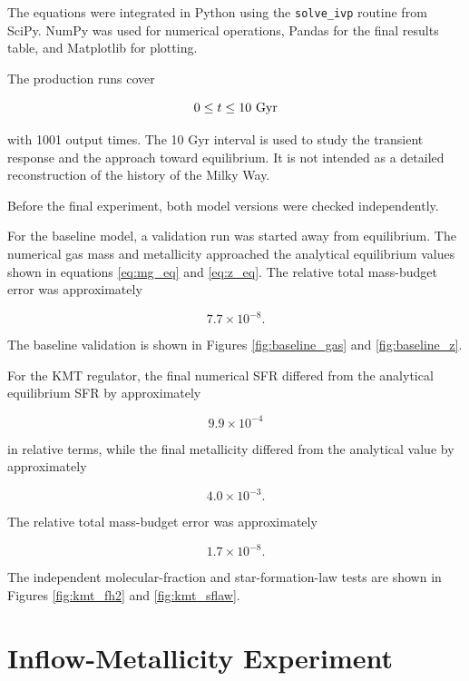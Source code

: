 \documentclass[10pt,a4paper]{article}
\begin{document}
The equations were integrated in Python using the \texttt{solve\_ivp} routine from SciPy. NumPy was used for numerical operations, Pandas for the final results table, and Matplotlib for plotting.

The production runs cover

\begin{equation}
0\leq t\leq10~{\rm Gyr}
\end{equation}

with 1001 output times. The 10 Gyr interval is used to study the transient response and the approach toward equilibrium. It is not intended as a detailed reconstruction of the history of the Milky Way.

Before the final experiment, both model versions were checked independently.

For the baseline model, a validation run was started away from equilibrium. The numerical gas mass and metallicity approached the analytical equilibrium values shown in equations \ref{eq:mg_eq} and \ref{eq:z_eq}. The relative total mass-budget error was approximately

\begin{equation}
7.7\times10^{-8}.
\end{equation}

The baseline validation is shown in Figures \ref{fig:baseline_gas} and \ref{fig:baseline_z}.

For the KMT regulator, the final numerical SFR differed from the analytical equilibrium SFR by approximately

\begin{equation}
9.9\times10^{-4}
\end{equation}

in relative terms, while the final metallicity differed from the analytical value by approximately

\begin{equation}
4.0\times10^{-3}.
\end{equation}

The relative total mass-budget error was approximately

\begin{equation}
1.7\times10^{-8}.
\end{equation}

The independent molecular-fraction and star-formation-law tests are shown in Figures \ref{fig:kmt_fh2} and \ref{fig:kmt_sflaw}.

\section{Inflow-Metallicity Experiment}
\end{document}

